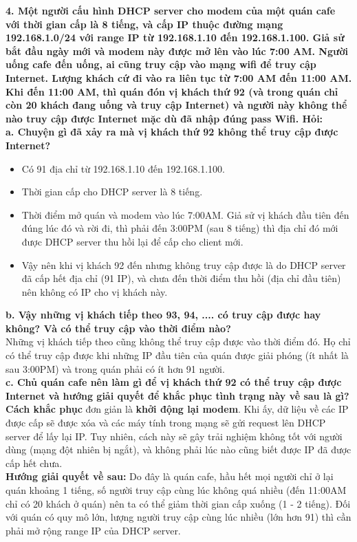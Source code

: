 \textbf{4.	Một người cấu hình DHCP server cho modem của một quán cafe với thời gian cấp là 8 tiếng, và cấp IP thuộc đường mạng 192.168.1.0/24 với range IP từ 192.168.1.10 đến 192.168.1.100. Giả sử bắt đầu ngày mới và modem này được mở lên vào lúc 7:00 AM. Người uống cafe đến uống, ai cũng truy cập vào mạng wifi để truy cập Internet. Lượng khách cứ đi vào ra liên tục từ 7:00 AM đến 11:00 AM. Khi đến 11:00 AM, thì quán đón vị khách thứ 92 (và trong quán chỉ còn 20 khách đang uống và truy cập Internet) và người này không thể nào truy cập được Internet mặc dù đã nhập đúng pass Wifi. Hỏi:}\\
\textbf{a.	Chuyện gì đã xảy ra mà vị khách thứ 92 không thể truy cập được Internet?}
\begin{itemize}
\item Có 91 địa chỉ từ 192.168.1.10 đến 192.168.1.100.
\item Thời gian cấp cho DHCP server là 8 tiếng.
\item Thời điểm mở quán và modem vào lúc 7:00AM. Giả sử vị khách đầu tiên đến đúng lúc đó và rời đi, thì phải đến 3:00PM (sau 8 tiếng) thì địa chỉ đó mới được DHCP server thu hồi lại để cấp cho client mới.
\item Vậy nên khi vị khách 92 đến nhưng không truy cập được là do DHCP server đã cấp hết địa chỉ (91 IP), và chưa đến thời điểm thu hồi (địa chỉ đầu tiên) nên không có IP cho vị khách này.
\end{itemize}

\textbf{b.	Vậy những vị khách tiếp theo 93, 94, .... có truy cập được hay không? Và có thể truy cập vào thời điểm nào?}\\
Những vị khách tiếp theo cũng không thể truy cập được vào thời điểm đó. Họ chỉ có thể truy cập được khi những IP đầu tiên của quán được giải phóng (ít nhất là sau 3:00PM) và trong quán phải có ít hơn 91 người.\\

\textbf{c.	Chủ quán cafe nên làm gì để vị khách thứ 92 có thể truy cập được Internet và hướng giải quyết để khắc phục tình trạng này về sau là gì?}\\
\textbf{Cách khắc phục} đơn giản là \textbf{khởi động lại modem}. Khi ấy, dữ liệu về các IP được cấp sẽ được xóa và các máy tính trong mạng sẽ gửi request lên DHCP server để lấy lại IP. Tuy nhiên, cách này sẽ gây trải nghiệm không tốt với người dùng (mạng đột nhiên bị ngắt), và không phải lúc nào cũng biết được IP đã được cấp hết chưa.\\
\textbf{Hướng giải quyết về sau:} Do đây là quán cafe, hầu hết mọi người chỉ ở lại quán khoảng 1 tiếng, số người truy cập cùng lúc không quá nhiều (đến 11:00AM chỉ có 20 khách ở quán) nên ta có thể giảm thời gian cấp xuống (1 - 2 tiếng). Đối với quán có quy mô lớn, lượng người truy cập cùng lúc nhiều (lớn hơn 91) thì cần phải mở rộng range IP của DHCP server.
